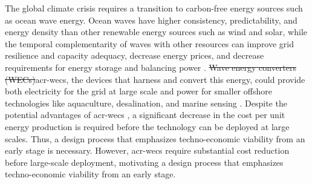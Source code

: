 \documentclass[a4paper,fleqn,colorlinks,unicode,lineno]{cas-dc} %
\makeatletter
\providecommand{\DIFdeltex}[1]{{\protect\color{red}\sout{#1}}} %
\providecommand{\DIFaddbegin}{} %
\providecommand{\DIFaddend}{} %
\providecommand{\DIFdelbegin}{} %
\providecommand{\DIFdelend}{} %
\providecommand{\DIFdel}[1]{\texorpdfstring{\DIFdeltex{#1}}{}} %
\providecommand{\DIFscaledelfig}{0.5}
\newlength{\DIFdelgraphicswidth} %
\newlength{\DIFdelgraphicsheight} %
\providecommand{\DIFaddincludegraphics}[2][]{{\color{blue}\fbox{\DIFOincludegraphics[#1]{#2}}}} %
\providecommand{\DIFdelincludegraphics}[2][]{%
\sbox{\DIFdelgraphicsbox}{\DIFOincludegraphics[#1]{#2}}%
\settoboxwidth{\DIFdelgraphicswidth}{\DIFdelgraphicsbox} %
\settoboxtotalheight{\DIFdelgraphicsheight}{\DIFdelgraphicsbox} %
\scalebox{\DIFscaledelfig}{%
\parbox[b]{\DIFdelgraphicswidth}{\usebox{\DIFdelgraphicsbox}\\[-\baselineskip] \rule{\DIFdelgraphicswidth}{0em}}\llap{\resizebox{\DIFdelgraphicswidth}{\DIFdelgraphicsheight}{%
\setlength{\unitlength}{\DIFdelgraphicswidth}%
\begin{picture}(1,1)%
\thicklines\linethickness{2pt} %
{\color[rgb]{1,0,0}\put(0,0){\framebox(1,1){}}}%
{\color[rgb]{1,0,0}\put(0,0){\line( 1,1){1}}}%
{\color[rgb]{1,0,0}\put(0,1){\line(1,-1){1}}}%
\end{picture}%
}\hspace*{3pt}}} %
} %
\DeclareRobustCommand{\DIFaddbegin}{\DIFOaddbegin \let\includegraphics\DIFaddincludegraphics} %
\DeclareRobustCommand{\DIFaddend}{\DIFOaddend \let\includegraphics\DIFOincludegraphics} %
\DeclareRobustCommand{\DIFdelbegin}{\DIFOdelbegin \let\includegraphics\DIFdelincludegraphics} %
\DeclareRobustCommand{\DIFdelend}{\DIFOaddend \let\includegraphics\DIFOincludegraphics} %
\let\sout@orig\sout %
\renewcommand{\sout}[1]{\ifmmode\text{\sout@orig{\ensuremath{#1}}}\else\sout@orig{#1}\fi} %
\makeatother
\begin{document}
The global climate crisis requires a transition to carbon-free energy sources such as ocean wave energy.
Ocean waves have higher consistency, predictability, and energy density than other renewable energy sources such as wind and solar, while the temporal complementarity of waves with other resources can improve grid resilience and capacity adequacy, decrease energy prices, and decrease requirements for energy storage and balancing power \citep{akdemir_opportunities_2023,bhattacharya_timing_2021,pennock_temporal_2022}.
\DIFdelbegin \DIFdel{Wave energy converters (WECs)}\DIFdelend \DIFaddbegin \glspl{acr-wec}\DIFaddend , the devices that harness and convert this energy, could provide both electricity for the grid at large scale and power for smaller offshore technologies like aquaculture, desalination, and marine sensing \citep{livecchi_powering_2019}.
\ifdefined\DISSERTATION
Despite the potential advantages of \glspl{acr-wec} , a significant decrease in the cost per unit energy production is required before the technology can be deployed at large scales. %
Thus, a design process that emphasizes techno-economic viability from an early stage is necessary.
\else
    However, \glspl{acr-wec} require substantial cost reduction before large-scale deployment, motivating a design process that emphasizes techno-economic viability from an early stage.
\fi
\end{document}
